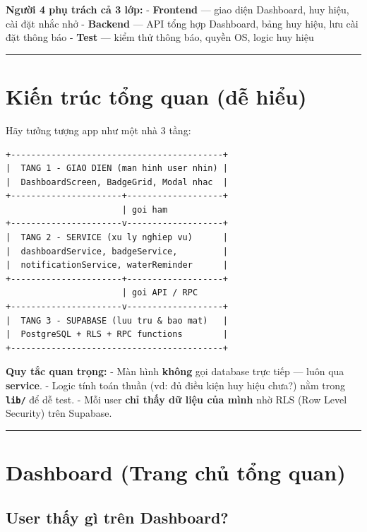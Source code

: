 \documentclass[12pt,a4paper]{article}
\begin{document}
\textbf{Người 4 phụ trách cả 3 lớp:} - \textbf{Frontend} --- giao diện
Dashboard, huy hiệu, cài đặt nhắc nhở - \textbf{Backend} --- API tổng
hợp Dashboard, bảng huy hiệu, lưu cài đặt thông báo - \textbf{Test} ---
kiểm thử thông báo, quyền OS, logic huy hiệu

\begin{center}\rule{0.5\linewidth}{0.5pt}\end{center}

\section{Kiến trúc tổng quan (dễ
hiểu)}\label{kiux1ebfn-truxfac-tux1ed5ng-quan-dux1ec5-hiux1ec3u}

Hãy tưởng tượng app như một nhà 3 tầng:

\begin{verbatim}
+------------------------------------------+
|  TANG 1 - GIAO DIEN (man hinh user nhin) |
|  DashboardScreen, BadgeGrid, Modal nhac  |
+----------------------+-------------------+
                       | goi ham
+----------------------v-------------------+
|  TANG 2 - SERVICE (xu ly nghiep vu)      |
|  dashboardService, badgeService,         |
|  notificationService, waterReminder      |
+----------------------+-------------------+
                       | goi API / RPC
+----------------------v-------------------+
|  TANG 3 - SUPABASE (luu tru & bao mat)   |
|  PostgreSQL + RLS + RPC functions        |
+------------------------------------------+
\end{verbatim}

\textbf{Quy tắc quan trọng:} - Màn hình \textbf{không} gọi database trực
tiếp --- luôn qua \textbf{service}. - Logic tính toán thuần (vd: đủ điều
kiện huy hiệu chưa?) nằm trong \textbf{\texttt{lib/}} để dễ test. - Mỗi
user \textbf{chỉ thấy dữ liệu của mình} nhờ RLS (Row Level Security)
trên Supabase.

\begin{center}\rule{0.5\linewidth}{0.5pt}\end{center}

\section{Dashboard (Trang chủ tổng
quan)}\label{dashboard-trang-chux1ee7-tux1ed5ng-quan}

\subsection{User thấy gì trên
Dashboard?}\label{user-thux1ea5y-guxec-truxean-dashboard}
\end{document}
